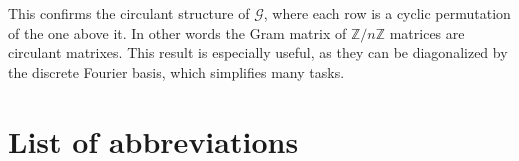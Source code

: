 \documentclass[12pt,letterpaper]{article}
\begin{document}
\begin{multicols}{2}
This confirms the circulant structure of $\mathcal{G}$, where each row is a cyclic permutation of the one above it. In other words the Gram matrix of $\mathbb{Z}/n\mathbb{Z}$ matrices are circulant matrixes. This result is especially useful, as they can be diagonalized by the discrete Fourier basis, which simplifies many tasks.




 
\section*{List of abbreviations}
\renewcommand{\glsnamefont}[1]{\textbf{#1}}
\printnoidxglossary[type=main, title={\vspace{-1cm}}, nonumberlist, nogroupskip, style=super]


\end{multicols}
\end{document}
